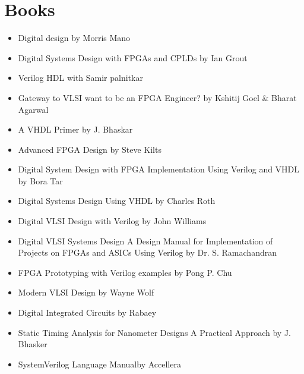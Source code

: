 \section{Books}
\begin{itemize}
    \item Digital design by Morris Mano
    \item Digital Systems Design with FPGAs and CPLDs by Ian Grout
    \item Verilog HDL with Samir palnitkar
    \item Gateway to VLSI want to be an FPGA Engineer? by Kshitij Goel \& Bharat Agarwal
    \item A VHDL Primer by J. Bhaskar
    \item Advanced FPGA Design by Steve Kilts
    \item Digital System Design with FPGA Implementation Using Verilog and VHDL by Bora Tar
    \item Digital Systems Design Using VHDL by Charles Roth
    \item Digital VLSI Design with Verilog by John Williams
    \item Digital VLSI Systems Design  A Design Manual for Implementation of Projects on FPGAs and ASICs Using Verilog by Dr. S. Ramachandran
    \item FPGA Prototyping with Verilog examples by Pong P. Chu
    \item Modern VLSI Design by Wayne Wolf
    \item Digital Integrated Circuits by Rabaey
    \item Static Timing Analysis for Nanometer Designs A Practical Approach by J. Bhasker
    \item SystemVerilog Language Manualby Accellera
\end{itemize}